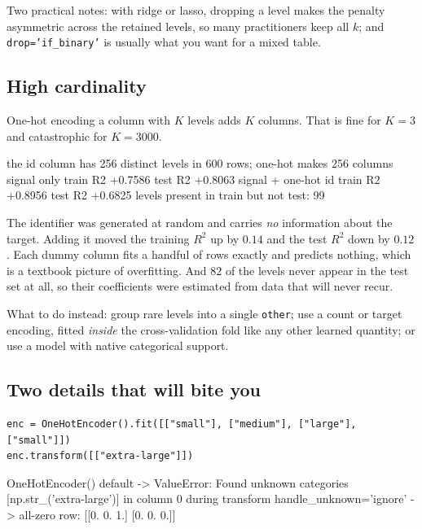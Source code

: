 \documentclass[11pt]{article}
\begin{document}
Two practical notes: with ridge or lasso, dropping a level makes the penalty
asymmetric across the retained levels, so many practitioners keep all $k$; and
\texttt{drop='if\_binary'} is usually what you want for a mixed table.

\subsection{High cardinality}
\label{sec:cardinality}

One-hot encoding a column with $K$ levels adds $K$ columns. That is fine for
$K = 3$ and catastrophic for $K = 3000$.

\begin{codeout}
the id column has 256 distinct levels in 600 rows; one-hot makes 256 columns
signal only          train R2 +0.7586   test R2 +0.8063
signal + one-hot id  train R2 +0.8956   test R2 +0.6825
levels present in train but not test: 99
\end{codeout}

The identifier was generated at random and carries \emph{no} information about
the target. Adding it moved the training $R^2$ up by $0.14$ and the test $R^2$
down by $0.12$. Each dummy column fits a handful of rows exactly and predicts
nothing, which is a textbook picture of overfitting. And $82$ of the levels
never appear in the test set at all, so their coefficients were estimated from
data that will never recur.

What to do instead: group rare levels into a single \texttt{other}; use a
count or target encoding, fitted \emph{inside} the cross-validation fold like
any other learned quantity; or use a model with native categorical support.

\subsection{Two details that will bite you}
\label{sec:encdetails}

\begin{lstlisting}
enc = OneHotEncoder().fit([["small"], ["medium"], ["large"], ["small"]])
enc.transform([["extra-large"]])
\end{lstlisting}
\begin{codeout}
OneHotEncoder() default  ->  ValueError: Found unknown categories
   [np.str_('extra-large')] in column 0 during transform
handle_unknown='ignore'  ->  all-zero row:
[[0. 0. 1.]
 [0. 0. 0.]]
\end{codeout}
\end{document}
